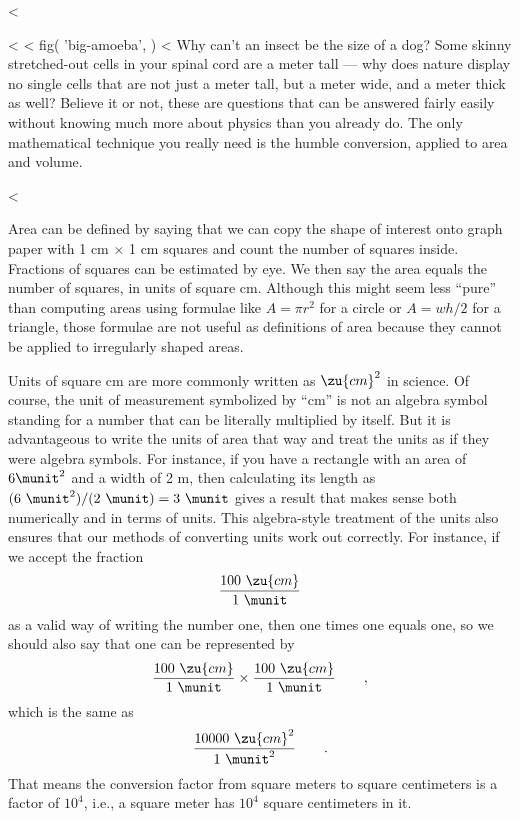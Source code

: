 <%

<%
<%
  fig(
    'big-amoeba',
  )
<%
Why can't an insect be the size of a dog? Some skinny
stretched-out cells in your spinal cord are a meter tall ---
why does nature display no single cells that are not just a
meter tall, but a meter wide, and a meter thick as well?
Believe it or not, these are questions that can be answered
fairly easily without knowing much more about physics than
you already do. The only mathematical technique you really
need is the humble conversion, applied to area and volume.

<%

Area can be defined by saying that we can copy the shape of
interest onto graph paper with 1 cm $\times$ 1 cm squares and
count the number of squares inside. Fractions of squares can
be estimated by eye. We then say the area equals the number
of squares, in units of square cm. Although this might seem
less ``pure'' than computing areas using formulae like
$A=\pi r^2$ for a circle or $A=wh/2$ for a triangle,
those formulae are not useful as definitions of area because
they cannot be applied to irregularly shaped areas.

Units of square cm are more commonly written as $\zu{cm}^2$ in
science. Of course, the unit of measurement symbolized by
``cm'' is not an algebra symbol standing for a number that
can be literally multiplied by itself. But it is advantageous
to write the units of area that way and treat the units as
if they were algebra symbols. For instance, if you have a
rectangle with an area of $6 \munit^2$ and a width of 2 m, then
calculating its length as $(6\ \munit^2)/(2\ \munit)=3\ \munit$ gives a result
that makes sense both numerically and in terms of units.
This algebra-style treatment of the units also ensures that
our methods of converting units work out correctly. For
instance, if we accept the fraction
\begin{equation*}
 \frac{100\ \zu{cm}}{1\ \munit}
\end{equation*}
as a valid way of writing the number one, then one times one
equals one, so we should also say that one can be represented by
\begin{equation*}
 \frac{100\ \zu{cm}}{1\ \munit} \times \frac{100\ \zu{cm}}{1\ \munit} \qquad ,
\end{equation*}
which is the same as
\begin{equation*}
 \frac{10000\ \zu{cm}^2}{1\ \munit^2} \qquad .
\end{equation*}
That means the conversion factor from square meters to
square centimeters is a factor of  $10^4$, i.e., a square
meter has $10^4$  square centimeters in it.

